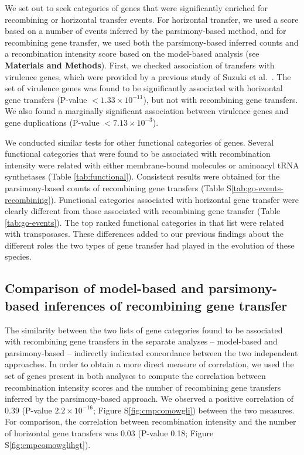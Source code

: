 \documentclass[10pt]{article}
\let\citet\cite
\begin{document}
We set out to seek categories of genes that were significantly enriched for
recombining or horizontal transfer events. For horizontal transfer, we used a
score based on a number of events inferred by the parsimony-based method, and
for recombining gene transfer, we used both the parsimony-based inferred counts
and a recombination intensity score based on the model-based analysis (see
\textbf{Materials and Methods}). First, we checked association of transfers with
virulence genes, which were provided by a previous study of Suzuki et al.\
\citet{Suzuki2011}.  The set of virulence genes was found to be significantly
associated with horizontal gene transfers (P-value $<1.33 \times 10^{-11}$), but
not with recombining gene transfers. We also found a marginally significant
association between virulence genes and gene duplications (P-value $<7.13 \times
10^{-3}$).

We conducted similar tests for other functional categories of genes. Several
functional categories that were found to be associated with recombination
intensity were related with either membrane-bound molecules or aminoacyl tRNA
synthetases (Table \ref{tab:functional}). Consistent results were obtained for
the parsimony-based counts of recombining gene transfers (Table
S\ref{tab:go-events-recombining}).  Functional categories associated with
horizontal gene transfer were clearly different from those associated with
recombining gene transfer (Table \ref{tab:go-events}). The top ranked functional
categories in that list were related with transposases. These differences added
to our previous findings about the different roles the two types of gene
transfer had played in the evolution of these species.

\subsection*{Comparison of model-based and parsimony-based inferences of recombining gene transfer}

The similarity between the two lists of gene categories found to be associated
with recombining gene transfers in the separate analyses -- model-based and
parsimony-based --  indirectly indicated concordance between the two independent
approaches.  In order to obtain a more direct measure of correlation, we used
the set of genes present in both analyses to compute the correlation between
recombination intensity scores and the number of recombining gene transfers
inferred by the parsimony-based approach. We observed a positive correlation of
$0.39$ (P-value $2.2\times10^{-16}$; Figure S\ref{fig:cmpcomowgli}) between the
two measures.  For comparison, the correlation between recombination intensity
and the number of horizontal gene transfers was 0.03 (P-value 0.18;
Figure S\ref{fig:cmpcomowglihgt}).  
\end{document}
